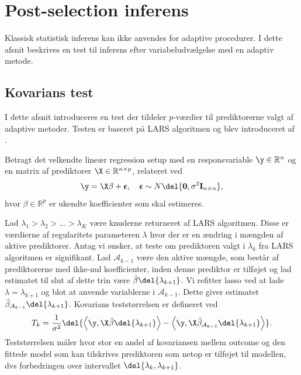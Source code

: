 \section{Post-selection inferens}
Klassisk statistisk inferens kan ikke anvendes for adaptive procedurer.
I dette afsnit beskrives en test til inferens efter variabeludvælgelse med en adaptiv metode.


\subsection{Kovarians test} \label{subsec:kovarians_test}
I dette afsnit introduceres en test der tildeler \(p\)-værdier til prediktorerne valgt af adaptive metoder.
Testen er baseret på LARS algoritmen og blev introduceret af \citep{lockhart}.

Betragt det velkendte lineær regression setup med en responsvariable \(\y \in \mathbb{R}^n\) og en matrix af prediktorer \(\X \in \mathbb{R}^{n \times p}\), relateret ved
\begin{align*}
\y = \X \beta + \boldsymbol{\epsilon}, \quad \boldsymbol{\epsilon} \sim N\del{\mathbf{0}, \sigma^2 \mathbf{I}_{n \times n}},
\end{align*}
hvor \(\beta \in \mathbb{R}^p\) er ukendte koefficienter som skal estimeres.

Lad $\lambda_1 > \lambda_2 > \ldots > \lambda_K$ være knuderne returneret af LARS algoritmen.
Disse er værdierne af regularitets parameteren $\lambda$ hvor der er en ændring i mængden af aktive prediktorer.
Antag vi ønsker, at teste om prediktoren valgt i \(\lambda_k\) fra LARS algoritmen er signifikant.
Lad \(\mathcal{A}_{k-1}\) være den aktive mængde, som består af prediktorerne med ikke-nul koefficienter, inden denne prediktor er tilføjet og lad estimatet til slut af dette trin være \(\hat{\beta} \del{\lambda_{k+1}}\).
Vi refitter lasso ved at lade \(\lambda=\lambda_{k+1}\) og blot at anvende variablerne i \(\mathcal{A}_{k-1}\).
Dette giver estimatet \( \hat{\beta}_{\mathcal{A}_{k-1}} \del{\lambda_{k+1}}\).
Kovarians teststørrelsen er defineret ved
\begin{align}
T_k = \frac{1}{\sigma^2} \del{ \left\langle \y, \X \hat{\beta} \del{\lambda_{k+1}} \right\rangle - \left\langle  \y, \X \hat{\beta}_{\mathcal{A}_{k-1}} \del{\lambda_{k+1}} \right\rangle}. \label{eq:6.5}
\end{align}
Teststørrelsen måler hvor stor en andel af kovariansen mellem outcome og den fittede model som kan tilskrives prediktoren som netop er tilføjet til modellen, dvs forbedringen over intervallet \(\del{\lambda_k, \lambda_{k+1}}\).

